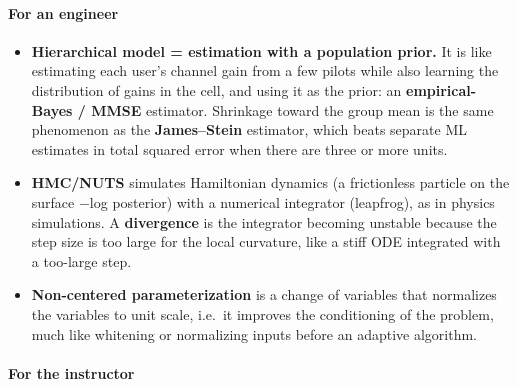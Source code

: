 \paragraph{For an engineer}

\begin{itemize}
\tightlist
\item
  \textbf{Hierarchical model = estimation with a population prior.} It
  is like estimating each user's channel gain from a few pilots while
  also learning the distribution of gains in the cell, and using it as
  the prior: an \textbf{empirical-Bayes / MMSE} estimator. Shrinkage
  toward the group mean is the same phenomenon as the
  \textbf{James--Stein} estimator, which beats separate ML estimates in
  total squared error when there are three or more units.
\item
  \textbf{HMC/NUTS} simulates Hamiltonian dynamics (a frictionless
  particle on the surface −log posterior) with a numerical integrator
  (leapfrog), as in physics simulations. A \textbf{divergence} is the
  integrator becoming unstable because the step size is too large for
  the local curvature, like a stiff ODE integrated with a too-large
  step.
\item
  \textbf{Non-centered parameterization} is a change of variables that
  normalizes the variables to unit scale, i.e.~it improves the
  conditioning of the problem, much like whitening or normalizing inputs
  before an adaptive algorithm.
\end{itemize}

\paragraph{For the instructor}

